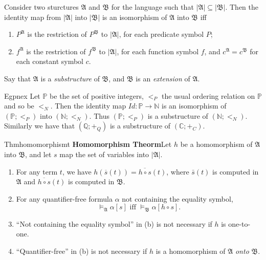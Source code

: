 Consider two sturctures $\mathfrak{A}$ and $\mathfrak{B}$ for the language such that $|\mathfrak{A}|\subseteq|\mathfrak{B}|$. Then the identity map from $|\mathfrak{A}|$ into $|\mathfrak{B}|$ is an isomorphism of $\mathfrak{A}$ into $\mathfrak{B}$ iff
\begin{enumerate}[label=(\alph*)]
  \item $P^{\mathfrak{A}}$ is the restriction of $P^{\mathfrak{B}}$ to $|\mathfrak{A}|$, for each predicate symbol $P$;
  \item $f^{\mathfrak{A}}$ is the restriction of $f^{\mathfrak{B}}$ to $|\mathfrak{A}|$, for each function symbol $f$, and $c^{\mathfrak{A}}=c^{\mathfrak{B}}$ for each constant symbol $c$.
\end{enumerate}
Say that $\mathfrak{A}$ is a \textit{substructure} of $\mathfrak{B}$, and $\mathfrak{B}$ is an \textit{extension} of $\mathfrak{A}$.

\begin{reference}{Eg}{pnex}
  Let $\mathbb{P}$ be the set of positive integers, $<_P$ the usual ordering relation on $\mathbb{P}$ and so be $<_N$. Then the identity map $Id:\mathbb{P}\rightarrow\mathbb{N}$ is an isomorphism of $(\mathbb{P};<_P)$ into $(\mathbb{N};<_N).$ Thus $(\mathbb{P};<_P)$ is a substructure of $(\mathbb{N};<_N).$ Similarly we have that $(\mathbb{Q};+_Q)$ is a substructure of $(\mathbb{C};+_C)$.
\end{reference}

\begin{reference}{Thm}{homomorphismt}
  \textbf{Homomorphism Theorm}\quad Let $h$ be a homomorphism of $\mathfrak{A}$ into $\mathfrak{B}$, and let $s$ map the set of variables into $|\mathfrak{A}|$.
  \begin{enumerate}[label=(\alph*)]
    \item For any term $t$, we have $h(\overline{s}(t))=\overline{h\circ s}(t)$, where $\bar{s}(t)$ is computed in $\mathfrak{A}$ and $\overline{h\circ s}(t)$ is computed in $\mathfrak{B}$.
    \item For any quantifier-free formula $\alpha$ not containing the equality symbol,
          \[
            \vDash_{\mathfrak{A}}\alpha[s]\text{ iff }\vDash_{\mathfrak{B}}\alpha[h\circ s].
          \]
    \item ``Not containing the equality symbol'' in (b) is not necessary if $h$ is one-to-one.
    \item ``Quantifier-free'' in (b) is not necessary if $h$ is a homomorphism of $\mathfrak{A}$ \textit{onto} $\mathfrak{B}$.\qedhere
  \end{enumerate}
\end{reference}


